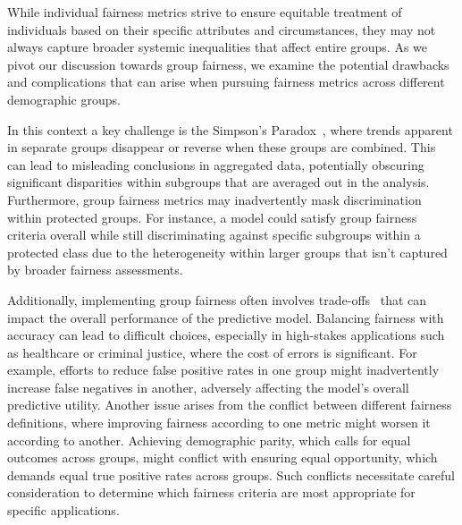 While individual fairness metrics strive to ensure equitable treatment of individuals based on their specific attributes and circumstances, they may not always capture broader systemic inequalities that affect entire groups. As we pivot our discussion towards group fairness, we examine the potential drawbacks and complications that can arise when pursuing fairness metrics across different demographic groups.

In this context a key challenge is the Simpson's Paradox~\citep{Simpson}, where trends apparent in separate groups disappear or reverse when these groups are combined. This can lead to misleading conclusions in aggregated data, potentially obscuring significant disparities within subgroups that are averaged out in the analysis. Furthermore, group fairness metrics may inadvertently mask discrimination within protected groups. For instance, a model could satisfy group fairness criteria overall while still discriminating against specific subgroups within a protected class due to the heterogeneity within larger groups that isn't captured by broader fairness assessments.

Additionally, implementing group fairness often involves trade-offs~\cite{Goh2016,Komiyama2018,Petrovic2021,Cruz2021,Liu2022} that can impact the overall performance of the predictive model. Balancing fairness with accuracy can lead to difficult choices, especially in high-stakes applications such as healthcare or criminal justice, where the cost of errors is significant. For example, efforts to reduce false positive rates in one group might inadvertently increase false negatives in another, adversely affecting the model's overall predictive utility. Another issue arises from the conflict between different fairness definitions, where improving fairness according to one metric might worsen it according to another. Achieving demographic parity, which calls for equal outcomes across groups, might conflict with ensuring equal opportunity, which demands equal true positive rates across groups. Such conflicts necessitate careful consideration to determine which fairness criteria are most appropriate for specific applications.

